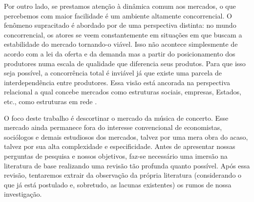 \documentclass[a4paper, 12pt, openright, oneside, german, french, english, brazil]{abntex2}
\begin{document}


	Por outro lado, se prestamos atenção à dinâmica comum aos mercados, o que percebemos com maior facilidade é um ambiente altamente concorrencial. O fenômeno supracitado é abordado por  de uma perspectiva distinta: no mundo concorrencial, os atores se veem constantemente em situações em que buscam a estabilidade do mercado tornando-o viável. Isso não acontece simplesmente de acordo com a lei da oferta e da demanda mas a partir do posicionamento dos produtores numa escala de qualidade que diferencia seus produtos. Para que isso seja possível, a concorrência total é inviável já que existe uma parcela de interdependência entre produtores. Essa visão está ancorada na perspectiva relacional a qual concebe mercados como estruturas sociais, empresas, Estados, etc., como estruturas em rede \cite{white2008,white2002markets,lazega2014redes}.


	O foco deste trabalho é descortinar o mercado da música de concerto. Esse mercado ainda permanece fora do interesse convencional de economistas, sociólogos e demais estudiosos dos mercados, talvez por uma mera obra do acaso, talvez por sua alta complexidade e especificidade. Antes de apresentar nossas perguntas de pesquisa e nossos objetivos, faz-se necessário uma imersão na literatura de base realizando uma revisão tão profunda quanto possível. Após essa revisão, tentaremos extrair da observação da própria literatura (considerando o que já está postulado e, sobretudo, as lacunas existentes) os rumos de nossa investigação.
\end{document}
